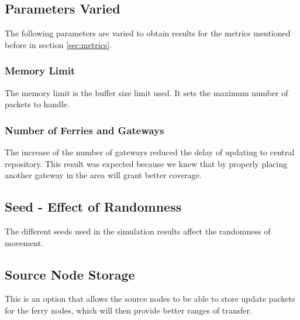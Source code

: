 \subsection{Parameters Varied} %
The following parameters are varied to obtain results for the metrics mentioned before in section \ref{sec:metrics}.
  
\subsubsection{Memory Limit}
The memory limit is the buffer size limit used.
It sets the maximum number of packets to handle.  

\subsubsection{Number of Ferries and Gateways}
The increase of the number of gateways reduced the delay of updating to central repository.  
This result was expected because we knew that by properly placing another gateway in the area will grant better coverage.  

\subsection{Seed - Effect of Randomness}
The different seeds used in the simulation results affect the randomness of movement.  

\subsection{Source Node Storage}
This is an option that allows the source nodes to be able to store update packets for the ferry nodes, which will then provide better ranges of transfer.
